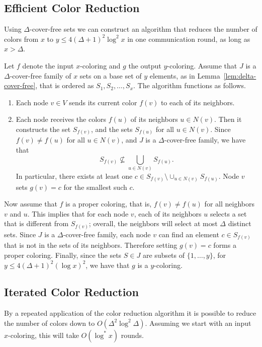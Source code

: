 \subsection{Efficient Color Reduction} \label{ssec:efficient-cr}

Using $\Delta$-cover-free sets we can construct an algorithm that reduces the number of colors from $x$ to $y \leq 4(\Delta+1)^2 \log^2 x$ in one communication round, as long as $x > \Delta$.

Let $f$ denote the input $x$-coloring and $g$ the output $y$-coloring. Assume that $J$ is a $\Delta$-cover-free family of $x$ sets on a base set of $y$ elements, as in Lemma~\ref{lem:delta-cover-free}, that is ordered as $S_1, S_2, \dots, S_x$. The algorithm functions as follows.
\begin{enumerate}
  \item Each node $v \in V$ sends its current color $f(v)$ to each of its neighbors.
  \item Each node receives the colors $f(u)$ of its neighbors $u \in N(v)$. Then it constructs the set $S_{f(v)}$, and the sets $S_{f(u)}$ for all $u \in N(v)$. Since $f(v) \neq f(u)$ for all $u\in N(v)$, and $J$ is a $\Delta$-cover-free family, we have that
  \[
    S_{f(v)} \nsubseteq \bigcup_{u \in N(v)} S_{f(u)}.
  \]
  In particular, there exists at least one $c \in S_{f(v)} \setminus \cup_{u \in N(v)} S_{f(u)}$. Node $v$ sets $g(v) = c$ for the smallest such $c$.
\end{enumerate}

Now assume that $f$ is a proper coloring, that is, $f(v) \neq f(u)$ for all neighbors $v$ and $u$. This implies that for each node $v$, each of its neighbors $u$ selects a set that is different from $S_{f(v)}$; overall, the neighbors will select at most $\Delta$ distinct sets. Since $J$ is a $\Delta$-cover-free family, each node $v$ can find an element $c \in S_{f(v)}$ that is not in the sets of its neighbors. Therefore setting $g(v) = c$ forms a proper coloring. Finally, since the sets $S \in J$ are subsets of $\{1,\dots,y\}$, for $y \leq 4(\Delta+1)^2 (\log x)^2$, we have that $g$ is a $y$-coloring.

\subsection{Iterated Color Reduction}

By a repeated application of the color reduction algorithm it is possible to reduce the number of colors down to $O(\Delta^2 \log^2 \Delta)$. Assuming we start with an input $x$-coloring, this will take $O(\log^* x)$ rounds.

